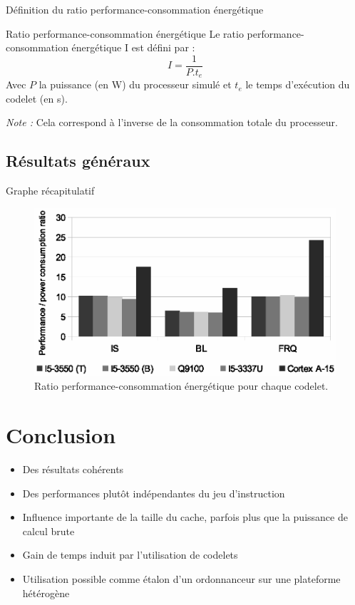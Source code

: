 \documentclass{beamer}
\begin{document}
\begin{frame}{Définition du ratio performance-consommation énergétique}
\begin{block}{Ratio performance-consommation énergétique}
Le ratio performance-consommation énergétique I est défini par :
\begin{equation*}
I=\frac{1}{P.t_e}
\end{equation*}
Avec $P$ la puissance (en W) du processeur simulé et $t_e$ le temps d'exécution du codelet (en s).
\end{block}
\textit{Note :} Cela correspond à l'inverse de la consommation totale du processeur.
\end{frame}

\subsection{Résultats généraux}

\begin{frame}{Graphe récapitulatif}
\begin{figure}
\centering
\includegraphics[width=0.65\paperwidth]{Ratio.eps}
\caption{\label{Ratio}Ratio performance-consommation énergétique pour chaque codelet.}
\end{figure}

\end{frame}

\section{Conclusion}
\begin{frame}
\begin{itemize}
\item Des résultats cohérents
\bigskip
\item Des performances plutôt indépendantes du jeu d'instruction
\bigskip
\item Influence importante de la taille du cache, parfois plus que la puissance de calcul brute
\bigskip
\item Gain de temps induit par l'utilisation de codelets
\bigskip
\item Utilisation possible comme étalon d'un ordonnanceur sur une plateforme hétérogène
\end{itemize}
\end{frame}
\end{document}
